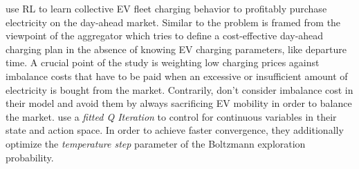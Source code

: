 \documentclass[12pt, article]{article}
\begin{document}
\textcite{vandael15_reinf_learn_heuris_ev_fleet} use RL to learn collective EV
fleet charging behavior to profitably purchase electricity on the day-ahead
market. Similar to \textcite{kahlen18_elect_vehic_virtual_power_plant_dilem} the
problem is framed from the viewpoint of the aggregator which tries to define a
cost-effective day-ahead charging plan in the absence of knowing EV charging
parameters, like departure time. A crucial point of the study is weighting low
charging prices against imbalance costs that have to be paid when an excessive or
insufficient  amount of electricity is bought from the market. Contrarily,
\textcite{kahlen18_elect_vehic_virtual_power_plant_dilem} don't consider imbalance
cost in their model and avoid them by always sacrificing EV mobility in order to
balance the market. \textcite{vandael15_reinf_learn_heuris_ev_fleet} use a
\emph{fitted Q Iteration} to control for continuous variables in their state and
action space. In order to achieve faster convergence, they additionally optimize
the \emph{temperature step} parameter of the Boltzmann exploration probability.
\end{document}
